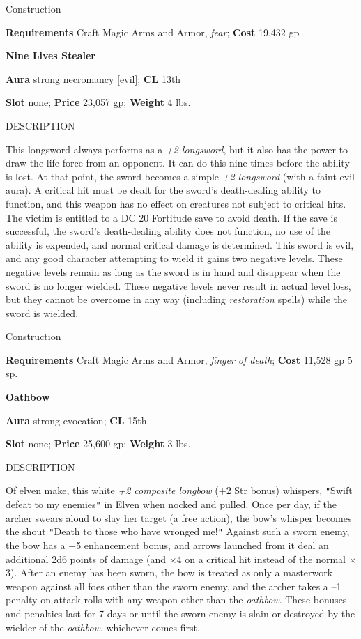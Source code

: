 Construction
				
\textbf{Requirements} Craft Magic Arms and Armor, \textit{fear}; \textbf{Cost }19,432 gp
				
\textbf{Nine Lives Stealer}
				
\textbf{Aura} strong necromancy \mbox{$[$}evil\mbox{$]$}; \textbf{CL} 13th
				
\textbf{Slot} none; \textbf{Price} 23,057 gp; \textbf{Weight} 4 lbs.
				
DESCRIPTION
				
This longsword always performs as a \textit{+2 longsword}, but it also has the power to draw the life force from an opponent. It can do this nine times before the ability is lost. At that point, the sword becomes a simple \textit{+2 longsword} (with a faint evil aura). A critical hit must be dealt for the sword's death-dealing ability to function, and this weapon has no effect on creatures not subject to critical hits. The victim is entitled to a DC 20 Fortitude save to avoid death. If the save is successful, the sword's death-dealing ability does not function, no use of the ability is expended, and normal critical damage is determined. This sword is evil, and any good character attempting to wield it gains two negative levels. These negative levels remain as long as the sword is in hand and disappear when the sword is no longer wielded. These negative levels never result in actual level loss, but they cannot be overcome in any way (including \textit{restoration} spells) while the sword is wielded. 
				
Construction
				
\textbf{Requirements} Craft Magic Arms and Armor, \textit{finger of death}; \textbf{Cost }11,528 gp 5 sp.
				
\textbf{Oathbow}
				
\textbf{Aura} strong evocation;\textbf{ CL }15th
				
\textbf{Slot} none; \textbf{Price} 25,600 gp; \textbf{Weight} 3 lbs.
				
DESCRIPTION
				
Of elven make, this white \textit{+2 composite longbow} (+2 Str bonus) whispers, \texttt{{}"{}}Swift defeat to my enemies\texttt{{}"{}} in Elven when nocked and pulled. Once per day, if the archer swears aloud to slay her target (a free action), the bow's whisper becomes the shout \texttt{{}"{}}Death to those who have wronged me!\texttt{{}"{}} Against such a sworn enemy, the bow has a +5 enhancement bonus, and arrows launched from it deal an additional 2d6 points of damage (and \mbox{$\times$}4 on a critical hit instead of the normal \mbox{$\times$}3). After an enemy has been sworn, the bow is treated as only a masterwork weapon against all foes other than the sworn enemy, and the archer takes a --1 penalty on attack rolls with any weapon other than the \textit{oathbow}. These bonuses and penalties last for 7 days or until the sworn enemy is slain or destroyed by the wielder of the \textit{oathbow}, whichever comes first.
				
